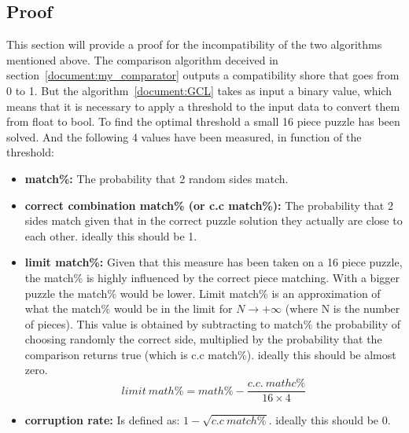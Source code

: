 \documentclass{article}
\begin{document}
\subsection{Proof}

This section will provide a proof for the incompatibility of
the two algorithms mentioned above.
\newline \newline
The comparison algorithm deceived in section~\ref{document:my_comparator} outputs a compatibility
shore that goes from 0 to 1.\newline
But the algorithm~\ref{document:GCL} takes as input a binary value,
which means that it is necessary to apply a threshold to the input
data to convert them from float to bool.
\newline \newline
To find the optimal threshold a small 16 piece puzzle has been solved.
And the following 4 values have been measured, in function of the threshold:

\begin{itemize}
  \item \textbf{match\%:}\newline
  The probability that 2 random sides match.
  
  \item \textbf{correct combination match\% (or c.c match\%):}\newline
  The probability that 2 sides match given that in the correct puzzle
  solution they actually are close to each other. ideally this should be 1.
  
  \item \textbf{limit match\%:}\newline
  Given that this measure has been taken on a 16 piece puzzle,
  the match\% is highly influenced by the correct piece matching.
  With a bigger puzzle the match\% would be lower.
  Limit match\% is an approximation of what the match\%
  would be in the limit for \(N \rightarrow + \infty\) (where N is the number of pieces).
  This value is obtained by subtracting to match\%
  the probability of choosing randomly the correct side,
  multiplied by the probability that the comparison returns true
  (which is c.c match\%). ideally this should be almost zero.
  \[limit \: math\% = math\% - \frac{c.c. \: mathc\%}{16 \times 4}\]
  
  \item \textbf{corruption rate:}\newline
  Is defined as: \(1-\sqrt{c.c \: match\%}\). ideally this should be 0.

\end{itemize}
\end{document}
